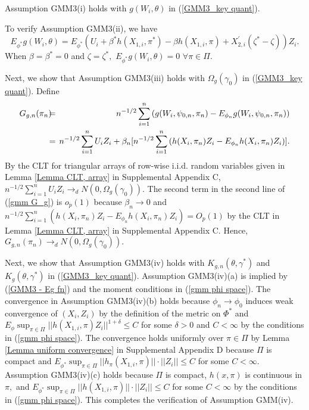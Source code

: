 \documentclass[12pt,titlepage,final,oneside,letterpaper]{article}
\begin{document}
Assumption GMM3(i) holds with $g(W_{i},\theta )$ in (\ref{GMM3_key quant}).

To verify Assumption GMM3(ii), we have%
\begin{equation}
E_{\phi ^{\ast }}g(W_{i},\theta )=E_{\phi ^{\ast }}\left( U_{i}+\beta ^{\ast
}h(X_{1,i},\pi ^{\ast })-\beta h(X_{1,i},\pi )+X_{2,i}^{\prime }(\zeta
^{\ast }-\zeta )\right) Z_{i}.  \label{GMM3 - Eg fn}
\end{equation}%
When $\beta =\beta ^{\ast }=0$ and $\zeta =\zeta ^{\ast },$ $E_{\phi ^{\ast
}}g(W_{i},\theta )=0$ $\forall \pi \in \Pi .$

Next, we show that Assumption GMM3(iii) holds with $\Omega _{g}(\gamma _{0})$
in (\ref{GMM3_key quant}). Define 
\begin{eqnarray}
G_{g,n}(\pi _{n})\hspace{-0.08in} &=&\hspace{-0.08in}n^{-1/2}\sum_{i=1}^{n}%
\left( g(W_{i},\psi _{0,n},\pi _{n})-E_{\phi _{n}}g(W_{i},\psi _{0,n},\pi
_{n})\right)  \label{gmm G_g} \\
\hspace{-0.08in} &=&\hspace{-0.08in}n^{-1/2}\sum_{i=1}^{n}U_{i}Z_{i}+\beta
_{n}[n^{-1/2}\sum_{i=1}^{n}\left( h(X_{i},\pi _{n})Z_{i}-E_{\phi
_{n}}h(X_{i},\pi _{n})Z_{i}\right) ].  \notag
\end{eqnarray}%
By the CLT for triangular arrays of row-wise i.i.d. random variables given
in Lemma \ref{Lemma CLT, array} in Supplemental Appendix C, $%
n^{-1/2}\sum_{i=1}^{n}U_{i}Z_{i}\rightarrow _{d}N(0,\Omega _{g}(\gamma
_{0})).$ The second term in the second line of (\ref{gmm G_g}) is $o_{p}(1)$
because $\beta _{n}\rightarrow 0$ and $n^{-1/2}\sum_{i=1}^{n}(h(X_{i},\pi
_{n})Z_{i}-E_{\phi _{n}}h(X_{i},\allowbreak \pi _{n})Z_{i})=O_{p}(1)$ by the
CLT in Lemma \ref{Lemma CLT, array} in Supplemental Appendix C. Hence, $%
G_{g,n}(\pi _{n})\rightarrow _{d}N(0,\Omega _{g}(\gamma _{0})).$

Next, we show that Assumption GMM3(iv) holds with $K_{g,n}(\theta ,\gamma
^{\ast })$ and $K_{g}(\theta ,\gamma ^{\ast })$ in (\ref{GMM3_key quant}).
Assumption GMM3(iv)(a) is implied by (\ref{GMM3 - Eg fn}) and the moment
conditions in (\ref{gmm phi space}). The convergence in Assumption
GMM3(iv)(b) holds because $\phi _{n}\rightarrow \phi _{0}$ induces weak
convergence of $(X_{i},Z_{i})$ by the definition of the metric on $\Phi
^{\ast }$ and $E_{\phi }\sup_{\pi \in \Pi }||h(X_{1,i},\allowbreak \pi
)Z_{i}||^{1+\delta }\leq C$ for some $\delta >0$ and $C<\infty $ by the
conditions in (\ref{gmm phi space}). The convergence holds uniformly over $%
\pi \in \Pi $ by Lemma \ref{Lemma uniform convergence} in Supplemental
Appendix D because $\Pi $ is compact and $E_{\phi ^{\ast }}\sup_{\pi \in \Pi
}||h_{\pi }(X_{1,i},\pi )||\cdot ||Z_{i}||\leq C$ for some $C<\infty .$
Assumption GMM3(iv)(c) holds because $\Pi $ is compact, $h(x,\pi )$ is
continuous in $\pi ,$ and $E_{\phi ^{\ast }}\sup_{\pi \in \Pi
}||h(X_{1,i},\pi )||\cdot ||Z_{i}||\leq C$ for some $C<\infty $ by the
conditions in (\ref{gmm phi space}). This completes the verification of
Assumption GMM(iv).
\end{document}
